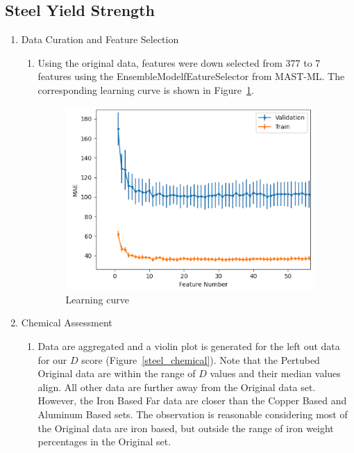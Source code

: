 \subsection{Steel Yield Strength}

\begin{enumerate}
    \item Data Curation and Feature Selection

    \begin{enumerate}

        \item Using the original data, features were down selected from 377 to 7 features using the EnsembleModelfEatureSelector from MAST-ML. The corresponding learning curve is shown in Figure~\ref{steel_learning_curve}.


    \begin{figure}[H]
    \centering
    \includegraphics[width=0.95\textwidth]{figures/steel_learning_curve.png}
    \caption{Learning curve}
    \label{steel_learning_curve}
    \end{figure}
    
    \end{enumerate}
    
    \item Chemical Assessment

    \begin{enumerate}

        \item Data are aggregated and a violin plot is generated for the left out data for our $D$ score (Figure~\ref{steel_chemical}). Note that the Pertubed Original data are within the range of $D$ values and their median values align. All other data are further away from the Original data set. However, the Iron Based Far data are closer than the Copper Based and Aluminum Based sets. The observation is reasonable considering most of the Original data are iron based, but outside the range of iron weight percentages in the Original set.


\end{enumerate}
\end{enumerate}
